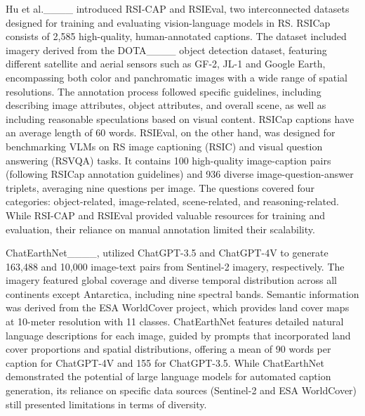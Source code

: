 Hu et al.____ introduced RSI-CAP and RSIEval, two interconnected datasets designed for training and evaluating vision-language models in RS. RSICap consists of 2,585 high-quality, human-annotated captions. The dataset included imagery derived from the DOTA____ object detection dataset, featuring different satellite and aerial sensors such as GF-2, JL-1 and Google Earth, encompassing both color and panchromatic images with a wide range of spatial resolutions. The annotation process followed specific guidelines, including describing image attributes, object attributes, and overall scene, as well as including reasonable speculations based on visual content. RSICap captions have an average length of 60 words. RSIEval, on the other hand, was designed for benchmarking VLMs on RS image captioning (RSIC) and visual question answering (RSVQA) tasks. It contains 100 high-quality image-caption pairs (following RSICap annotation guidelines) and 936 diverse image-question-answer triplets, averaging nine questions per image. The questions covered four categories: object-related, image-related, scene-related, and reasoning-related. While RSI-CAP and RSIEval provided valuable resources for training and evaluation, their reliance on manual annotation limited their scalability.

ChatEarthNet____, utilized ChatGPT-3.5 and ChatGPT-4V to generate 163,488 and 10,000 image-text pairs from Sentinel-2 imagery, respectively. The imagery featured global coverage and diverse temporal distribution across all continents except Antarctica, including nine spectral bands. Semantic information was derived from the ESA WorldCover project, which provides land cover maps at 10-meter resolution with 11 classes. ChatEarthNet features detailed natural language descriptions for each image, guided by prompts that incorporated land cover proportions and spatial distributions, offering a mean of 90 words per caption for ChatGPT-4V and 155 for ChatGPT-3.5. While ChatEarthNet demonstrated the potential of large language models for automated caption generation, its reliance on specific data sources (Sentinel-2 and ESA WorldCover) still presented limitations in terms of diversity.

